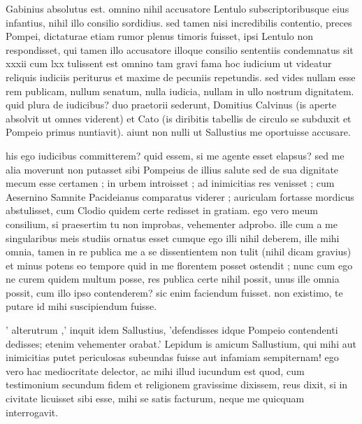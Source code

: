


 Gabinius absolutus est. omnino nihil accusatore Lentulo subscriptoribusque eius infantius, nihil illo consilio sordidius. sed tamen nisi incredibilis contentio, preces Pompei, dictaturae etiam rumor plenus timoris fuisset, ipsi Lentulo non respondisset, qui tamen illo accusatore illoque consilio sententiis condemnatus sit xxxii cum lxx tulissent est omnino tam gravi fama hoc iudicium ut videatur reliquis iudiciis periturus et maxime de pecuniis repetundis. sed vides nullam esse rem publicam, nullum senatum, nulla iudicia, nullam in ullo nostrum dignitatem. quid plura de iudicibus? duo praetorii sederunt, Domitius Calvinus (is aperte absolvit ut omnes viderent) et Cato (is diribitis tabellis de circulo se subduxit et Pompeio primus nuntiavit). aiunt non nulli ut Sallustius me oportuisse accusare.

 his ego iudicibus committerem? quid essem, si me agente esset elapsus? sed me alia moverunt non putasset sibi Pompeius de illius salute sed de sua dignitate mecum esse certamen ; in urbem introisset ; ad inimicitias res venisset ; cum Aesernino Samnite Pacideianus comparatus viderer ; auriculam fortasse mordicus abstulisset, cum Clodio quidem certe redisset in gratiam. ego vero meum consilium, si praesertim tu non improbas, vehementer adprobo. ille cum a me singularibus meis studiis ornatus esset cumque ego illi nihil deberem, ille mihi omnia, tamen in re publica me a se dissentientem non tulit (nihil dicam gravius) et minus potens eo tempore quid in me florentem posset ostendit ; nunc cum ego ne curem quidem multum posse, res publica certe nihil possit, unus ille omnia possit, cum illo ipso contenderem? sic enim faciendum fuisset. non existimo, te putare id mihi suscipiendum fuisse.

 ' alterutrum ,' inquit idem Sallustius, 'defendisses idque Pompeio contendenti dedisses; etenim vehementer orabat.' Lepidum is amicum Sallustium, qui mihi aut inimicitias putet periculosas subeundas fuisse aut infamiam sempiternam! ego vero hac mediocritate delector, ac mihi illud iucundum est quod, cum testimonium secundum fidem et religionem gravissime dixissem, reus dixit, si in civitate licuisset sibi esse, mihi se satis facturum, neque me quicquam interrogavit.

